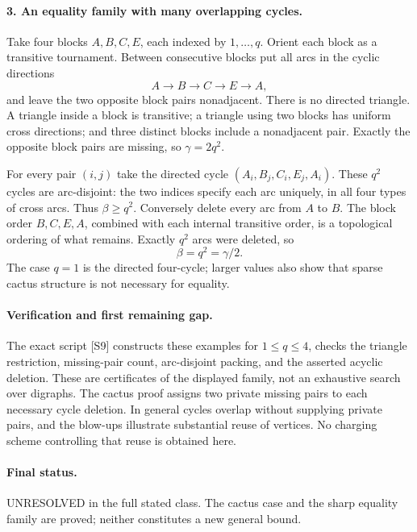 \documentclass[11pt,a4paper]{article}
\begin{document}
\paragraph{3. An equality family with many overlapping cycles.}
Take four blocks $A,B,C,E$, each indexed by $1,\ldots,q$. Orient each
block as a transitive tournament. Between consecutive blocks put all
arcs in the cyclic directions
\[
 A\longrightarrow B\longrightarrow C\longrightarrow E
 \longrightarrow A,
\]
and leave the two opposite block pairs nonadjacent. There is no directed
triangle. A triangle inside a block is transitive; a triangle using
two blocks has uniform cross directions; and three distinct blocks
include a nonadjacent pair. Exactly the opposite block pairs are
missing, so $\gamma=2q^2$.

For every pair $(i,j)$ take the directed cycle
$(A_i,B_j,C_i,E_j,A_i)$. These $q^2$ cycles are arc-disjoint: the two
indices specify each arc uniquely, in all four types of cross arcs.
Thus $\beta\ge q^2$. Conversely delete every arc from $A$ to $B$.
The block order $B,C,E,A$, combined with each internal transitive
order, is a topological ordering of what remains. Exactly $q^2$ arcs
were deleted, so
\[
                 \beta=q^2=\gamma/2.
\]
The case $q=1$ is the directed four-cycle; larger values also show that
sparse cactus structure is not necessary for equality.

\paragraph{Verification and first remaining gap.}
The exact script [S9] constructs these examples for $1\le q\le4$,
checks the triangle restriction, missing-pair count, arc-disjoint
packing, and the asserted acyclic deletion. These are certificates of
the displayed family, not an exhaustive search over digraphs. The
cactus proof assigns two private missing pairs to each necessary
cycle deletion. In general cycles overlap without supplying private
pairs, and the blow-ups illustrate substantial reuse of vertices.
No charging scheme controlling that reuse is obtained here.

\paragraph{Final status.}
UNRESOLVED in the full stated class. The cactus case and the sharp
equality family are proved; neither constitutes a new general bound.
\end{document}
